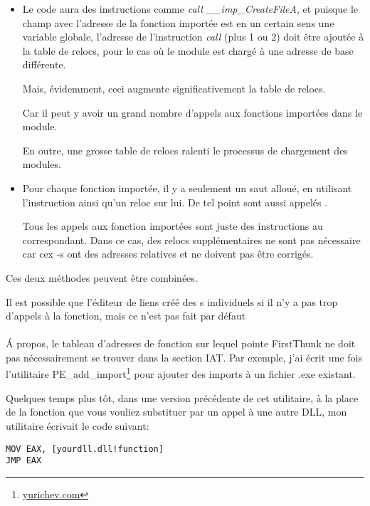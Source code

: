 \begin{itemize}
\item Le code aura des instructions comme \emph{call \_\_imp\_CreateFileA}, et puisque
le champ avec l'adresse de la fonction importée est en un certain sens une variable
globale, l'adresse de l'instruction \emph{call} (plus 1 ou 2) doit être ajoutée à la
table de relocs, pour le cas où le module est chargé à une adresse de base différente.

Mais, évidemment, ceci augmente significativement la table de relocs.

Car il peut y avoir un grand nombre d'appels aux fonctions importées dans le module.

En outre, une grosse table de relocs ralenti le processus de chargement des modules.

\item Pour chaque fonction importée, il y a seulement un saut alloué, en utilisant
l'instruction \JMP ainsi qu'un reloc sur lui.
De tel point sont aussi appelés .

Tous les appels aux fonction importées sont juste des instructions \CALL au 
correspondant. Dans ce cas, des relocs supplémentaires ne sont pas nécessaire car
cex \CALL{}-s ont des adresses relatives et ne doivent pas être corrigés.
\end{itemize}

Ces deux méthodes peuvent être combinées.

Il est possible que l'éditeur de liens créé des s individuels si il n'y
a pas trop d'appels à la fonction, mais ce n'est pas fait par défaut \\
\\
Á propos, le tableau d'adresses de fonction sur lequel pointe FirstThunk ne doit
pas nécessairement se trouver dans la section \ac{IAT}. Par exemple, j'ai écrit une
fois l'utilitaire PE\_add\_import\footnote{\href{http://go.yurichev.com/17049}{yurichev.com}}
pour ajouter des imports à un fichier .exe existant.

Quelques temps plus tôt, dans une version précédente de cet utilitaire, à la place
de la fonction que vous vouliez substituer par un appel à une autre DLL, mon utilitaire
écrivait le code suivant:

\begin{lstlisting}
MOV EAX, [yourdll.dll!function]
JMP EAX
\end{lstlisting}

